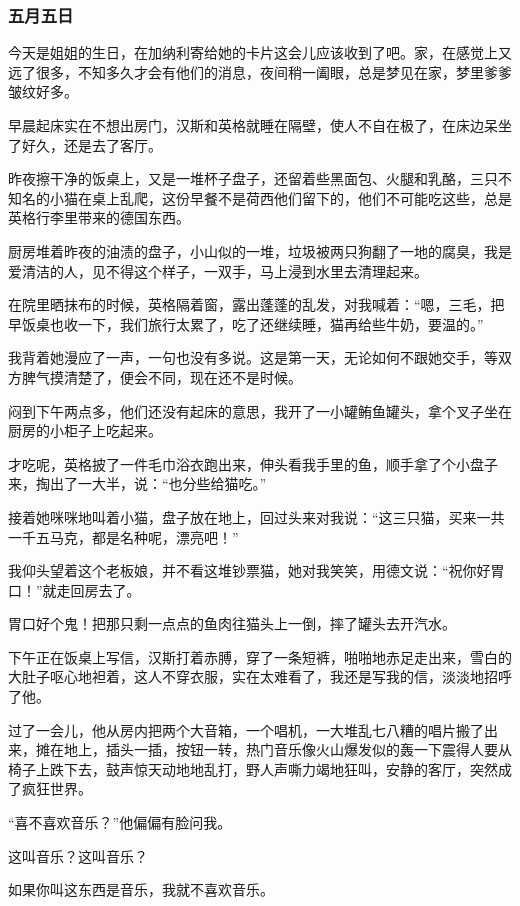 \subsubsection{五月五日}
\par 今天是姐姐的生日，在加纳利寄给她的卡片这会儿应该收到了吧。家，在感觉上又远了很多，不知多久才会有他们的消息，夜间稍一阖眼，总是梦见在家，梦里爹爹皱纹好多。
\par 早晨起床实在不想出房门，汉斯和英格就睡在隔壁，使人不自在极了，在床边呆坐了好久，还是去了客厅。
\par 昨夜擦干净的饭桌上，又是一堆杯子盘子，还留着些黑面包、火腿和乳酪，三只不知名的小猫在桌上乱爬，这份早餐不是荷西他们留下的，他们不可能吃这些，总是英格行李里带来的德国东西。
\par 厨房堆着昨夜的油渍的盘子，小山似的一堆，垃圾被两只狗翻了一地的腐臭，我是爱清洁的人，见不得这个样子，一双手，马上浸到水里去清理起来。
\par 在院里晒抹布的时候，英格隔着窗，露出蓬蓬的乱发，对我喊着：“嗯，三毛，把早饭桌也收一下，我们旅行太累了，吃了还继续睡，猫再给些牛奶，要温的。”
\par 我背着她漫应了一声，一句也没有多说。这是第一天，无论如何不跟她交手，等双方脾气摸清楚了，便会不同，现在还不是时候。
\par 闷到下午两点多，他们还没有起床的意思，我开了一小罐鲔鱼罐头，拿个叉子坐在厨房的小柜子上吃起来。
\par 才吃呢，英格披了一件毛巾浴衣跑出来，伸头看我手里的鱼，顺手拿了个小盘子来，掏出了一大半，说：“也分些给猫吃。”
\par 接着她咪咪地叫着小猫，盘子放在地上，回过头来对我说：“这三只猫，买来一共一千五马克，都是名种呢，漂亮吧！”
\par 我仰头望着这个老板娘，并不看这堆钞票猫，她对我笑笑，用德文说：“祝你好胃口！”就走回房去了。
\par 胃口好个鬼！把那只剩一点点的鱼肉往猫头上一倒，摔了罐头去开汽水。
\par 下午正在饭桌上写信，汉斯打着赤膊，穿了一条短裤，啪啪地赤足走出来，雪白的大肚子呕心地袒着，这人不穿衣服，实在太难看了，我还是写我的信，淡淡地招呼了他。
\par 过了一会儿，他从房内把两个大音箱，一个唱机，一大堆乱七八糟的唱片搬了出来，摊在地上，插头一插，按钮一转，热门音乐像火山爆发似的轰一下震得人要从椅子上跌下去，鼓声惊天动地地乱打，野人声嘶力竭地狂叫，安静的客厅，突然成了疯狂世界。
\par “喜不喜欢音乐？”他偏偏有脸问我。
\par 这叫音乐？这叫音乐？
\par 如果你叫这东西是音乐，我就不喜欢音乐。
